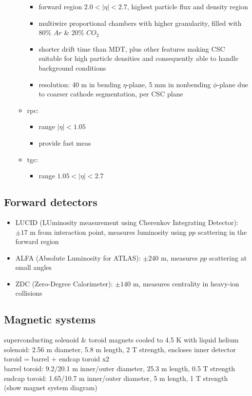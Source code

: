 \documentclass[../thesis.tex]{subfiles}
\begin{document}
\begin{itemize}
\begin{multicols}{2}
\begin{itemize}
	\begin{itemize}
	\item forward region $2.0<|\eta|<2.7$, highest particle flux and density region
	\item multiwire proportional chambers with higher granularity, filled with 80\% $Ar$ \& 20\% $CO_2$
	\item shorter drift time than MDT, plus other features making CSC suitable for high particle densities and consequently able to handle background conditions
	\item resolution: 40 \textmu m in bending $\eta$-plane, 5 mm in nonbending $\phi$-plane due to coarser cathode segmentation, per CSC plane
	\end{itemize}
	
\columnbreak
\item rpc:
	\begin{itemize}
	\item range $|\eta|<1.05$
	\item provide fast meas
	\end{itemize}
\item tgc:
	\begin{itemize}
	\item range $1.05<|\eta|<2.7$
	\end{itemize}
\end{itemize}
\end{multicols}
\end{itemize}

\subsection{Forward detectors}
\begin{itemize}
\item LUCID (LUminosity measurement using Cherenkov Integrating Detector): $\pm 17$ m from interaction point, measures luminosity using $pp$ scattering in the forward region
\item ALFA (Absolute Luminosity for ATLAS): $\pm 240$ m, measures $pp$ scattering at small angles
\item ZDC (Zero-Degree Calorimeter): $\pm 140$ m, measures centrality in heavy-ion collisions
\end{itemize}

\subsection{Magnetic systems}
superconducting solenoid \& toroid magnets cooled to 4.5 K with liquid helium\\
solenoid: 2.56 m diameter, 5.8 m length, 2 T strength, encloses inner detector\\
toroid = barrel + endcap toroid x2\\
barrel toroid: 9.2/20.1 m inner/outer diameter, 25.3 m length, 0.5 T strength\\
endcap toroid: 1.65/10.7 m inner/outer diameter, 5 m length, 1 T strength\\
(show magnet system diagram)
\end{document}
